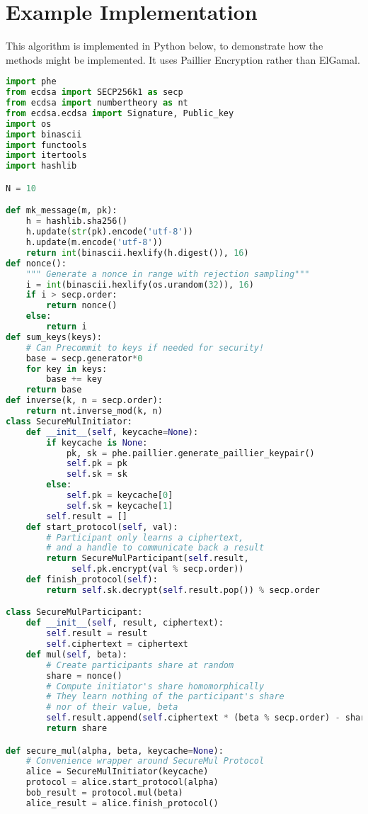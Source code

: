 \documentclass{article}
\begin{document}
\section{Example Implementation}
This algorithm is implemented in Python below, to demonstrate how the methods might be implemented. It uses Paillier Encryption rather than ElGamal.
\begin{lstlisting}[language=Python]
import phe
from ecdsa import SECP256k1 as secp
from ecdsa import numbertheory as nt
from ecdsa.ecdsa import Signature, Public_key
import os
import binascii
import functools
import itertools
import hashlib

N = 10

def mk_message(m, pk):
    h = hashlib.sha256()
    h.update(str(pk).encode('utf-8'))
    h.update(m.encode('utf-8'))
    return int(binascii.hexlify(h.digest()), 16)
def nonce():
    """ Generate a nonce in range with rejection sampling"""
    i = int(binascii.hexlify(os.urandom(32)), 16)
    if i > secp.order:
        return nonce()
    else:
        return i
def sum_keys(keys):
    # Can Precommit to keys if needed for security!
    base = secp.generator*0
    for key in keys:
        base += key
    return base
def inverse(k, n = secp.order):
    return nt.inverse_mod(k, n)
class SecureMulInitiator:
    def __init__(self, keycache=None):
        if keycache is None:
            pk, sk = phe.paillier.generate_paillier_keypair()
            self.pk = pk
            self.sk = sk
        else:
            self.pk = keycache[0]
            self.sk = keycache[1]
        self.result = []
    def start_protocol(self, val):
        # Participant only learns a ciphertext, 
        # and a handle to communicate back a result
        return SecureMulParticipant(self.result,
        	 self.pk.encrypt(val % secp.order))
    def finish_protocol(self):
        return self.sk.decrypt(self.result.pop()) % secp.order

class SecureMulParticipant:
    def __init__(self, result, ciphertext):
        self.result = result
        self.ciphertext = ciphertext
    def mul(self, beta):
        # Create participants share at random
        share = nonce()
        # Compute initiator's share homomorphically
        # They learn nothing of the participant's share
        # nor of their value, beta
        self.result.append(self.ciphertext * (beta % secp.order) - share)
        return share

def secure_mul(alpha, beta, keycache=None):
    # Convenience wrapper around SecureMul Protocol
    alice = SecureMulInitiator(keycache)
    protocol = alice.start_protocol(alpha)
    bob_result = protocol.mul(beta)
    alice_result = alice.finish_protocol()


\end{lstlisting}
\end{document}
